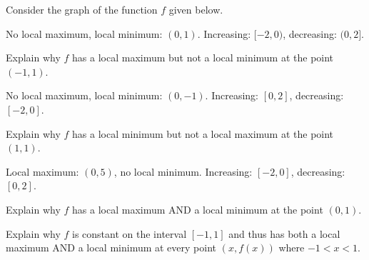 \documentclass{ximera}
\begin{document}
\begin{question}
Consider the graph of the function $f$ given below.  

\begin{center}

% 


\end{center}

\begin{solution}
No local maximum,  local minimum: $(0,1)$.  Increasing: $[-2,0)$, decreasing: $(0,2]$.
\end{solution}

\end{question}

\begin{question}
Explain why $f$ has a local maximum but not a local minimum at the point $(-1, 1)$.
\begin{solution}
No local maximum,  local minimum: $(0,-1)$.  Increasing: $[0,2]$, decreasing: $[-2,0]$.
\end{solution}

\end{question}

\begin{question}
Explain why  $f$ has a local minimum but not a local maximum at the point $(1, 1)$.
\begin{solution}
Local maximum: $(0,5)$, no local minimum.  Increasing: $[-2,0]$, decreasing: $[0,2]$.
\end{solution}

\end{question}

\begin{question}
Explain why $f$ has a local maximum AND a local minimum at the point $(0, 1)$.
\end{question}

\begin{question}
Explain why $f$ is constant on the interval $[-1, 1]$ and thus has both a local maximum AND a local minimum at every point $(x, f(x))$ where $-1 < x < 1$.
\end{question}
\end{document}
